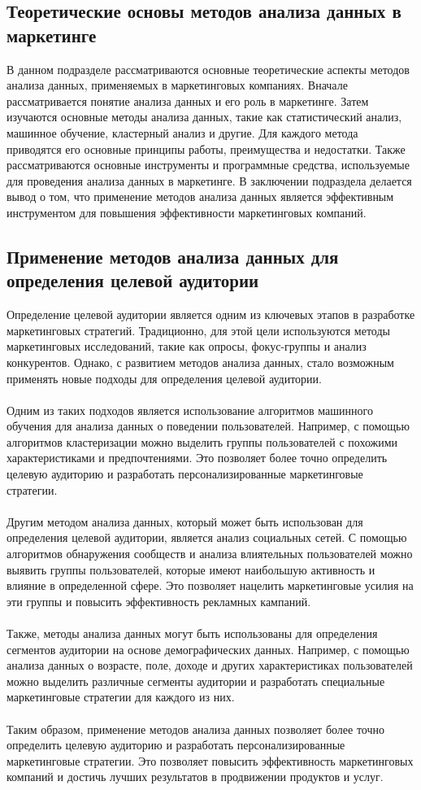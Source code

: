 \documentclass{article}
\begin{document}
\subsection{Теоретические основы методов анализа данных в маркетинге}
В данном подразделе рассматриваются основные теоретические аспекты методов анализа данных, применяемых в маркетинговых компаниях. Вначале рассматривается понятие анализа данных и его роль в маркетинге. Затем изучаются основные методы анализа данных, такие как статистический анализ, машинное обучение, кластерный анализ и другие. Для каждого метода приводятся его основные принципы работы, преимущества и недостатки. Также рассматриваются основные инструменты и программные средства, используемые для проведения анализа данных в маркетинге. В заключении подраздела делается вывод о том, что применение методов анализа данных является эффективным инструментом для повышения эффективности маркетинговых компаний.
\subsection{Применение методов анализа данных для определения целевой аудитории}
Определение целевой аудитории является одним из ключевых этапов в разработке маркетинговых стратегий. Традиционно, для этой цели используются методы маркетинговых исследований, такие как опросы, фокус-группы и анализ конкурентов. Однако, с развитием методов анализа данных, стало возможным применять новые подходы для определения целевой аудитории.\\
~\\
Одним из таких подходов является использование алгоритмов машинного обучения для анализа данных о поведении пользователей. Например, с помощью алгоритмов кластеризации можно выделить группы пользователей с похожими характеристиками и предпочтениями. Это позволяет более точно определить целевую аудиторию и разработать персонализированные маркетинговые стратегии.\\
~\\
Другим методом анализа данных, который может быть использован для определения целевой аудитории, является анализ социальных сетей. С помощью алгоритмов обнаружения сообществ и анализа влиятельных пользователей можно выявить группы пользователей, которые имеют наибольшую активность и влияние в определенной сфере. Это позволяет нацелить маркетинговые усилия на эти группы и повысить эффективность рекламных кампаний.\\
~\\
Также, методы анализа данных могут быть использованы для определения сегментов аудитории на основе демографических данных. Например, с помощью анализа данных о возрасте, поле, доходе и других характеристиках пользователей можно выделить различные сегменты аудитории и разработать специальные маркетинговые стратегии для каждого из них.\\
~\\
Таким образом, применение методов анализа данных позволяет более точно определить целевую аудиторию и разработать персонализированные маркетинговые стратегии. Это позволяет повысить эффективность маркетинговых компаний и достичь лучших результатов в продвижении продуктов и услуг.\\
~\\
\end{document}
